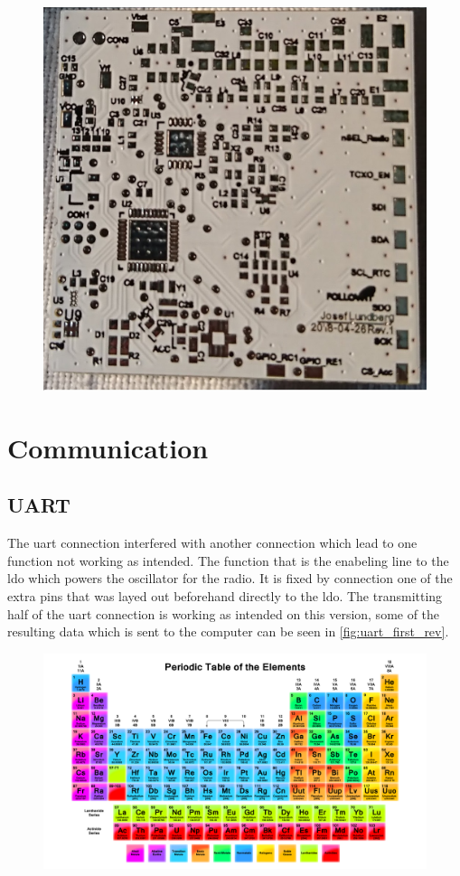 \begin{figure}[H]
	\centering
    \includegraphics[width=.8\linewidth]{Figures/PWB}
	\label{fig:pcbr1}
\end{figure}

\section{Communication}

\subsection{UART}
The \gls{uart} connection interfered with another connection which lead to one function not working as intended. The function that is the enabeling line to the \gls{ldo} which powers the oscillator for the radio. It is fixed by connection one of the extra pins that was layed out beforehand directly to the \gls{ldo}. The transmitting half of the \gls{uart} connection is working as intended on this version, some of the resulting data which is sent to the computer can be seen in \autoref{fig:uart_first_rev}.

\begin{figure}[H] 
	\centering 
	\includegraphics[width=.8\linewidth]{Figures/uart_first_rev} 
	\label{fig:uart_first_rev} 
\end{figure} 

